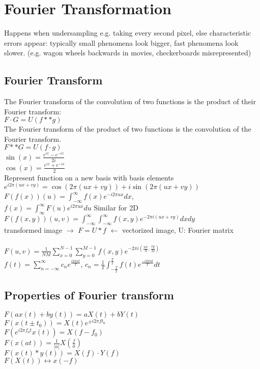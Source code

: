 \section{Fourier Transformation}
 Happens when undersampling e.g. taking every second pixel, else characteristic errors appear: typically small phenomena look bigger, fast phenomena look slower. (e.g. wagon wheels backwards in movies, checkerboards misrepresented)
\subsection*{Fourier Transform}
 The Fourier transform of the convolution of two functions is the product of their Fourier transform:\\
$F \cdot G = U(f ** g)$\\
 The Fourier transform of the product of two functions is the convolution of the Fourier transform.\\
$F ** G = U(f \cdot g)$\\
$\sin(x) = \frac{e^{ix} - e^{-ix}}{2i}$\\
$\cos(x) = \frac{e^{ix} + e^{-ix}}{2}$\\
Represent function on a new basis with basis elements $e^{i 2 \pi (ux + vy)} = \cos(2 \pi (ux + vy)) + i \sin(2 \pi (ux + vy))$\\
$F(f(x))(u) = \int_{-\infty}^{\infty} f(x) e^{-i 2 \pi ux} dx$, \\
 $f(x) = \int_{\infty}^{\infty} F(u)e^{i2\pi ux} du$ Similar for 2D \\
 $F(f(x,y))(u, v) = \int_{-\infty}^{\infty} \int_{-\infty}^{\infty} f(x, y) e^{-2\pi i (ux + vy)}dx dy$\\
 transformed image $\rightarrow$ $F = U * f$ $\leftarrow$ vectorized image, U: Fourier matrix\\
 \\$F(u, v) = \frac{1}{NM}\sum_{x=0}^{N-1} \sum_{y=0}^{M-1} f(x, y) e^{-2\pi i (\frac{ux}{N}, \frac{vy}{M})}$\\ %
 $f(t) = \sum_{n = -\infty}^{\infty} c_n e^{\frac{i 2 \pi n t}{T}}$, $c_n = \frac{1}{T} \int_{-\frac{T}{2}}^{\frac{T}{2}} f(t) e^{\frac{-i 2 \pi n t}{T}} dt$
\subsection*{Properties of Fourier transform}
 $F(ax(t) + by(t)) = aX(t) + bY(t)$\\
 $F(x(t \pm t_0)) = X(t) e^{\pm i 2 \pi f t_0}$\\
 $F(e^{i 2 \pi f_0 t} x(t)) = X(f - f_0)$\\
 $F(x(at)) = \frac{1}{|a|}X\left(\frac{f}{a}\right)$\\
 $F(x(t) * y(t)) = X(f) \cdot Y(f)$\\
 $F(X(t)) \longleftrightarrow x(-f)$

